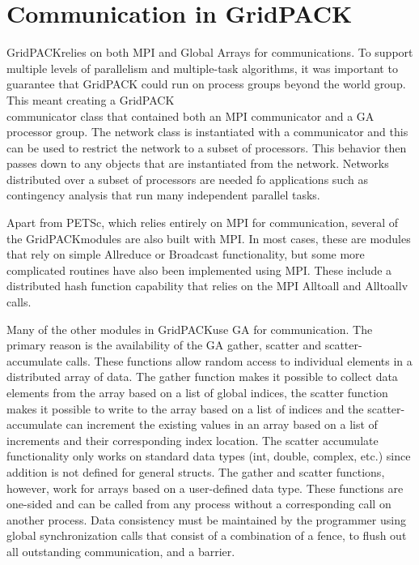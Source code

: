 \documentclass[preprint]{acm_proc_article-sp}
\begin{document}
\section{Communication in GridPACK\texttrademark}
GridPACK\texttrademark relies on both MPI\cite{MPI1} and Global Arrays\cite{GA}
for communications.
To support multiple levels of parallelism and multiple-task algorithms, it was
important to guarantee that GridPACK could run on process groups beyond the
world group. This meant creating a GridPACK\texttrademark\\
communicator class
that contained both an MPI communicator and a GA processor group. The network
class is instantiated with a communicator and this can be used to restrict the
network to a subset of processors. This behavior then passes down to any
objects that are instantiated from the network. Networks distributed over a
subset of processors are needed fo applications such as contingency
analysis\cite{CA}
that run many independent parallel tasks.

Apart from PETSc, which relies entirely on MPI for communication, several of the
GridPACK\texttrademark modules are also built with MPI. In most cases, these are
modules that rely on simple Allreduce or Broadcast functionality, but some more
complicated routines have also been implemented using MPI. These include a
distributed hash function capability that relies on the MPI Alltoall and
Alltoallv calls.

Many of the other modules in GridPACK\texttrademark use GA for communication.
The primary reason is the availability of the GA gather, scatter and
scatter-accumulate calls. These functions allow random access to individual
elements in a distributed array of data. The gather function makes it possible
to collect data elements from the array based on a list of global indices,
the scatter function makes it possible to write to the array based on a list of
indices and the scatter-accumulate can increment the existing values in an array
based on a list of increments and their corresponding index location. The
scatter accumulate functionality only works on standard data types (int, double,
complex, etc.) since addition is not defined for general structs. The gather and
scatter functions, however, work for arrays based on a user-defined data type.
These functions are one-sided and can be called from any process without a
corresponding call on another process. Data consistency must be maintained by
the programmer using global synchronization calls that consist of a combination
of a fence, to flush out all outstanding communication, and a barrier.
\end{document}
